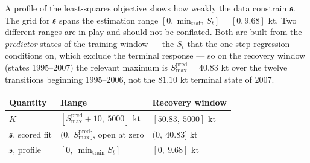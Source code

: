 \documentclass[11pt]{article}
\begin{document}
A profile of the least-squares objective shows how weakly the data
constrain \(\mathfrak s\). The grid for \(\mathfrak s\) spans the estimation range
\([0, \min_{\mathrm{train}} S_t] = [0, 9.68]\) kt. Two different ranges are in play and should not be conflated. Both are
built from the \emph{predictor} states of the training window --- the
\(S_t\) that the one-step regression conditions on, which exclude the
terminal response --- so on the recovery window (states 1995--2007) the
relevant maximum is \(S^{\mathrm{pred}}_{\max} = 40.83\) kt over the
twelve transitions beginning 1995--2006, not the \(81.10\) kt terminal
state of 2007.

\begin{longtable}[]{@{}lll@{}}
\toprule\noalign{}
Quantity & Range & Recovery window \\
\midrule\noalign{}
\endhead
\bottomrule\noalign{}
\endlastfoot
\(K\) & \([S^{\mathrm{pred}}_{\max}+10,\ 5000]\) kt & \([50.83,\ 5000]\) kt \\
\(\mathfrak s\), scored fit & \((0,\ S^{\mathrm{pred}}_{\max}]\), open at zero & \((0,\ 40.83]\) kt \\
\(\mathfrak s\), profile & \([0,\ \min_{\mathrm{train}} S_t]\) & \([0,\ 9.68]\) kt \\
\end{longtable}
\end{document}
